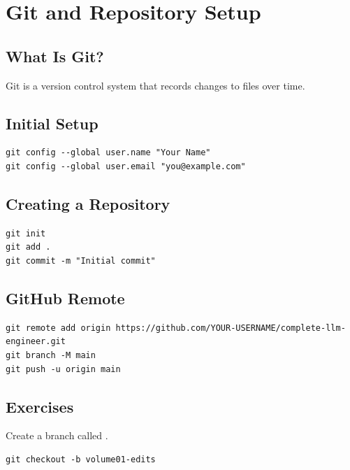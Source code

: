 \chapter{Git and Repository Setup}
\label{chap:git-setup}
\section{What Is Git?}\begin{definition}Git is a version control system that records changes to files over time.\end{definition}
\section{Initial Setup}\begin{lstlisting}[style=bashstyle]
git config --global user.name "Your Name"
git config --global user.email "you@example.com"
\end{lstlisting}
\section{Creating a Repository}\begin{lstlisting}[style=bashstyle]
git init
git add .
git commit -m "Initial commit"
\end{lstlisting}
\section{GitHub Remote}\begin{lstlisting}[style=bashstyle]
git remote add origin https://github.com/YOUR-USERNAME/complete-llm-engineer.git
git branch -M main
git push -u origin main
\end{lstlisting}
\section{Exercises}\begin{exercise}Create a branch called .\end{exercise}\begin{solution}\begin{lstlisting}[style=bashstyle]
git checkout -b volume01-edits
\end{lstlisting}\end{solution}
